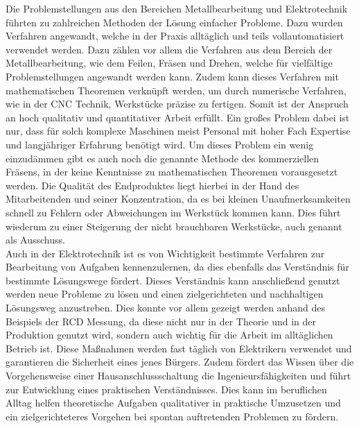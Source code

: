 Die Problemstellungen aus den Bereichen Metallbearbeitung und Elektrotechnik führten zu zahlreichen Methoden der Lösung einfacher Probleme. Dazu wurden 
Verfahren angewandt, welche in der Praxis alltäglich und teils vollautomatisiert verwendet werden. Dazu zählen vor allem die Verfahren aus dem Bereich 
der Metallbearbeitung, wie \zB dem Feilen, Fräsen und Drehen, welche für vielfältige Problemstellungen angewandt werden kann. Zudem kann dieses Verfahren 
mit mathematischen Theoremen verknüpft werden, um \zB durch numerische Verfahren, wie in der CNC Technik, Werkstücke präzise zu fertigen. Somit ist der 
Anspruch an hoch qualitativ und quantitativer Arbeit erfüllt. Ein großes Problem dabei ist nur, dass für solch komplexe Maschinen meist Personal mit 
hoher Fach Expertise und langjähriger Erfahrung benötigt wird. Um dieses Problem ein wenig einzudämmen gibt es auch noch die genannte Methode des 
kommerziellen Fräsens, in der keine Kenntnisse zu mathematischen Theoremen vorausgesetzt werden. Die Qualität des Endproduktes liegt hierbei in der Hand 
des Mitarbeitenden und seiner Konzentration, da es bei kleinen Unaufmerksamkeiten schnell zu Fehlern oder Abweichungen im Werkstück kommen kann. Dies 
führt wiederum zu einer Steigerung der nicht brauchbaren Werkstücke, auch genannt als Ausschuss.\\
Auch in der Elektrotechnik ist es von Wichtigkeit bestimmte Verfahren zur Bearbeitung von Aufgaben kennenzulernen, da dies ebenfalls das Verständnis für 
bestimmte Lösungswege fördert. Dieses Verständnis kann anschließend genutzt werden neue Probleme zu lösen und einen zielgerichteten und nachhaltigen 
Lösungsweg anzustreben. Dies konnte vor allem gezeigt werden anhand des Beispiels der RCD Messung, da diese nicht nur in der Theorie und in der 
Produktion genutzt wird, sondern auch wichtig für die Arbeit im alltäglichen Betrieb ist. Diese Maßnahmen werden fast täglich von Elektrikern verwendet 
und garantieren die Sicherheit eines jenes Bürgers. Zudem fördert das Wissen über die Vorgehensweise einer Hausanschlussschaltung die Ingenieursfähigkeiten 
und führt zur Entwicklung eines praktischen Verständnisses. Dies kann im beruflichen Alltag helfen theoretische Aufgaben qualitativer in praktische 
Umzusetzen und ein zielgerichteteres Vorgehen bei spontan auftretenden Problemen zu fördern.

\clearpage
